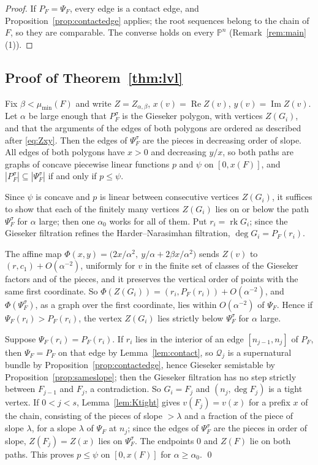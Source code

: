 \documentclass[11pt]{amsart}
\theoremstyle{definition}
\theoremstyle{remark}
\newcommand{\PP}{\mathbb{P}}
\newcommand{\cQ}{\mathcal{Q}}
\DeclareMathOperator{\rk}{rk}
\begin{document}
\begin{proof}
If $P_F=\Psi_F$, every edge is a contact edge, and Proposition~\ref{prop:contactedge} applies; the root sequences belong to the chain of $F$, so they are comparable. The converse holds on every $\PP^n$ (Remark~\ref{rem:main}(1)).
\end{proof}

\subsection{Proof of Theorem~\ref{thm:lvl}}
Fix $\beta<\mu_{\min}(F)$ and write $Z=Z_{\alpha,\beta}$, $x(v)=\operatorname{Re}Z(v)$, $y(v)=\operatorname{Im}Z(v)$. Let $\alpha$ be large enough that $P^\sigma_F$ is the Gieseker polygon, with vertices $Z(G_i)$, and that the arguments of the edges of both polygons are ordered as described after \eqref{eq:Zxy}. Then the edges of $\Psi^\sigma_F$ are the pieces in decreasing order of slope. All edges of both polygons have $x>0$ and decreasing $y/x$, so both paths are graphs of concave piecewise linear functions $p$ and $\psi$ on $[0,x(F)]$, and $|P^\sigma_F|\subseteq|\Psi^\sigma_F|$ if and only if $p\le\psi$.

Since $\psi$ is concave and $p$ is linear between consecutive vertices $Z(G_i)$, it suffices to show that each of the finitely many vertices $Z(G_i)$ lies on or below the path $\Psi^\sigma_F$ for $\alpha$ large; then one $\alpha_0$ works for all of them. Put $r_i=\rk G_i$; since the Gieseker filtration refines the Harder--Narasimhan filtration, $\deg G_i=P_F(r_i)$.

The affine map $\Phi(x,y)=\big(2x/\alpha^2,\ y/\alpha+2\beta x/\alpha^2\big)$ sends $Z(v)$ to $(r,c_1)+O(\alpha^{-2})$, uniformly for $v$ in the finite set of classes of the Gieseker factors and of the pieces, and it preserves the vertical order of points with the same first coordinate. So $\Phi(Z(G_i))=(r_i,P_F(r_i))+O(\alpha^{-2})$, and $\Phi(\Psi^\sigma_F)$, as a graph over the first coordinate, lies within $O(\alpha^{-2})$ of $\Psi_F$. Hence if $\Psi_F(r_i)>P_F(r_i)$, the vertex $Z(G_i)$ lies strictly below $\Psi^\sigma_F$ for $\alpha$ large.

Suppose $\Psi_F(r_i)=P_F(r_i)$. If $r_i$ lies in the interior of an edge $[n_{j-1},n_j]$ of $P_F$, then $\Psi_F=P_F$ on that edge by Lemma~\ref{lem:contact}, so $\cQ_j$ is a supernatural bundle by Proposition~\ref{prop:contactedge}, hence Gieseker semistable by Proposition~\ref{prop:sameslope}; then the Gieseker filtration has no step strictly between $F_{j-1}$ and $F_j$, a contradiction. So $G_i=F_j$ and $(n_j,\deg F_j)$ is a tight vertex. If $0<j<s$, Lemma~\ref{lem:Ktight} gives $v(F_j)=v(x)$ for a prefix $x$ of the chain, consisting of the pieces of slope $>\lambda$ and a fraction of the piece of slope $\lambda$, for a slope $\lambda$ of $\Psi_F$ at $n_j$; since the edges of $\Psi^\sigma_F$ are the pieces in order of slope, $Z(F_j)=Z(x)$ lies on $\Psi^\sigma_F$. The endpoints $0$ and $Z(F)$ lie on both paths. This proves $p\le\psi$ on $[0,x(F)]$ for $\alpha\ge\alpha_0$. \qed
\end{document}

